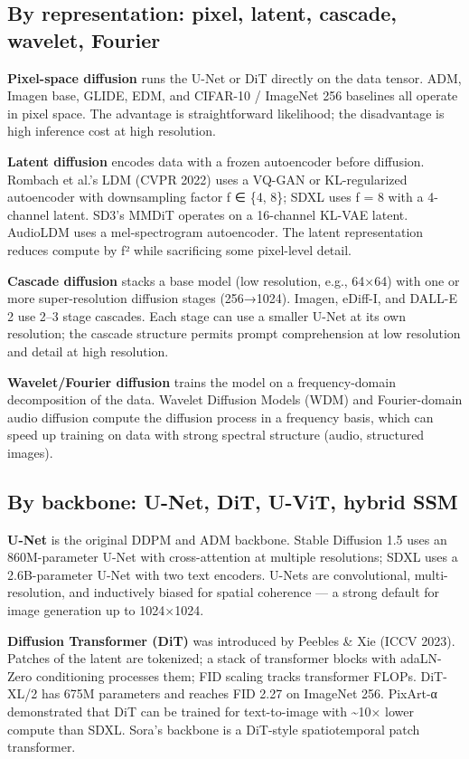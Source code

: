 \documentclass{article}
\begin{document}
\subsection{By representation: pixel, latent, cascade, wavelet, Fourier}\label{by-representation-pixel-latent-cascade-wavelet-fourier}

\textbf{Pixel-space diffusion} runs the U-Net or DiT directly on the data tensor. ADM, Imagen base, GLIDE, EDM, and CIFAR-10 / ImageNet 256 baselines all operate in pixel space. The advantage is straightforward likelihood; the disadvantage is high inference cost at high resolution.

\textbf{Latent diffusion} encodes data with a frozen autoencoder before diffusion. Rombach et al.'s LDM (CVPR 2022) uses a VQ-GAN or KL-regularized autoencoder with downsampling factor f ∈ \{4, 8\}; SDXL uses f = 8 with a 4-channel latent. SD3's MMDiT operates on a 16-channel KL-VAE latent. AudioLDM uses a mel-spectrogram autoencoder. The latent representation reduces compute by f² while sacrificing some pixel-level detail.

\textbf{Cascade diffusion} stacks a base model (low resolution, e.g., 64×64) with one or more super-resolution diffusion stages (256→1024). Imagen, eDiff-I, and DALL-E 2 use 2--3 stage cascades. Each stage can use a smaller U-Net at its own resolution; the cascade structure permits prompt comprehension at low resolution and detail at high resolution.

\textbf{Wavelet/Fourier diffusion} trains the model on a frequency-domain decomposition of the data. Wavelet Diffusion Models (WDM) and Fourier-domain audio diffusion compute the diffusion process in a frequency basis, which can speed up training on data with strong spectral structure (audio, structured images).

\subsection{By backbone: U-Net, DiT, U-ViT, hybrid SSM}\label{by-backbone-u-net-dit-u-vit-hybrid-ssm}

\textbf{U-Net} is the original DDPM and ADM backbone. Stable Diffusion 1.5 uses an 860M-parameter U-Net with cross-attention at multiple resolutions; SDXL uses a 2.6B-parameter U-Net with two text encoders. U-Nets are convolutional, multi-resolution, and inductively biased for spatial coherence --- a strong default for image generation up to 1024×1024.

\textbf{Diffusion Transformer (DiT)} was introduced by Peebles \& Xie (ICCV 2023). Patches of the latent are tokenized; a stack of transformer blocks with adaLN-Zero conditioning processes them; FID scaling tracks transformer FLOPs. DiT-XL/2 has 675M parameters and reaches FID 2.27 on ImageNet 256. PixArt-α \citep{chen20242024} demonstrated that DiT can be trained for text-to-image with \textasciitilde10× lower compute than SDXL. Sora's backbone is a DiT-style spatiotemporal patch transformer.
\end{document}
